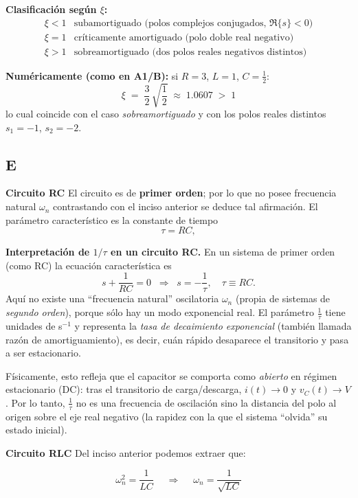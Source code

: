\textbf{Clasificación según $\xi$:}
\[
\begin{array}{ll}
\xi < 1 & \text{subamortiguado (polos complejos conjugados, }\Re\{s\}<0\text{)}\\[2pt]
\xi = 1 & \text{críticamente amortiguado (polo doble real negativo)}\\[2pt]
\xi > 1 & \text{sobreamortiguado (dos polos reales negativos distintos)}
\end{array}
\]

\textbf{Numéricamente (como en A1/B):} si $R=3$, $L=1$, $C=\tfrac{1}{2}$:
\[
\xi \;=\; \frac{3}{2}\,\sqrt{\frac{1}{2}} \;\approx\; 1.0607 \;>\; 1
\]
lo cual coincide con el caso \emph{sobreamortiguado} y con los polos reales distintos $s_1=-1$, $s_2=-2$.

\subsection{E}

\textbf{Circuito RC}
El circuito es de \textbf{primer orden}; por lo que no posee frecuencia natural \(\omega_n\) contrastando con el inciso anterior se deduce tal afirmación. 
El parámetro característico es la constante de tiempo
\[
\tau = RC,
\]

\textbf{Interpretación de $1/\tau$ en un circuito RC.}
En un sistema de primer orden (como RC) la ecuación característica es
\[
s+\frac{1}{RC}=0 \;\;\Rightarrow\;\; s=-\frac{1}{\tau},\quad \tau\equiv RC.
\]
Aquí no existe una “frecuencia natural” oscilatoria \(\omega_n\) (propia de sistemas de \emph{segundo orden}), porque sólo hay un modo exponencial real. 
El parámetro \(\tfrac{1}{\tau}\) tiene unidades de s\(^{-1}\) y representa la \emph{tasa de decaimiento exponencial} (también llamada razón de amortiguamiento), es decir, cuán rápido desaparece el transitorio y pasa a ser estacionario.

Físicamente, esto refleja que el capacitor se comporta como \emph{abierto} en régimen estacionario (DC): tras el transitorio de carga/descarga, \(i(t)\to 0\) y \(v_C(t)\to V\). 
Por lo tanto, \(\tfrac{1}{\tau}\) no es una frecuencia de oscilación sino la distancia del polo al origen sobre el eje real negativo (la rapidez con la que el sistema “olvida” su estado inicial).


\bigskip

\textbf{Circuito RLC}
Del inciso anterior podemos extraer que:

\[
\boxed{\;\omega_n^2=\frac{1}{LC}\;} \quad\Longrightarrow\quad
\boxed{\;\omega_n=\frac{1}{\sqrt{LC}}\;}
\]

